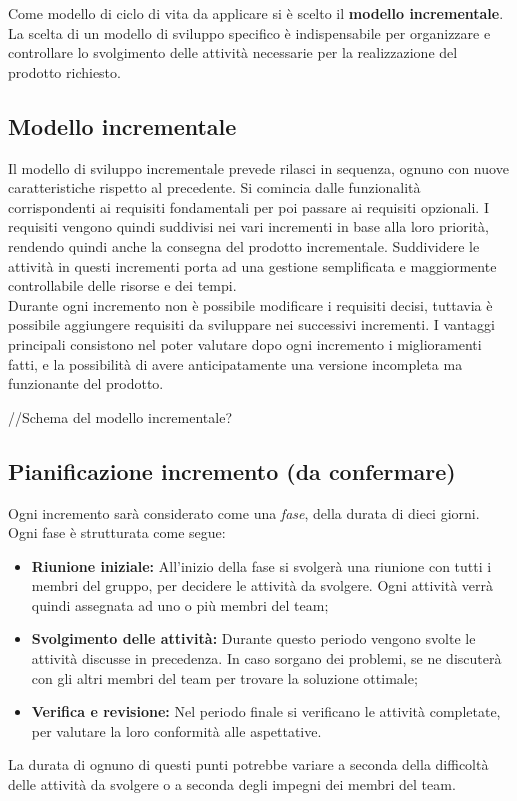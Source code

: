 Come modello di ciclo di vita da applicare si è scelto il \textbf{modello incrementale}. La scelta di un modello di sviluppo specifico è indispensabile per organizzare e controllare lo svolgimento delle attività necessarie per la realizzazione del prodotto richiesto.

\subsection{Modello incrementale}
Il modello di sviluppo incrementale prevede rilasci in sequenza, ognuno con nuove caratteristiche rispetto al precedente. Si comincia dalle funzionalità corrispondenti ai requisiti fondamentali per poi passare ai requisiti opzionali. I requisiti vengono quindi suddivisi nei vari incrementi in base alla loro priorità, rendendo quindi anche la consegna del prodotto incrementale.
Suddividere le attività in questi incrementi porta ad una gestione semplificata e maggiormente controllabile delle risorse e dei tempi.\\
Durante ogni incremento non è possibile modificare i requisiti decisi, tuttavia è possibile aggiungere requisiti da sviluppare nei successivi incrementi.
I vantaggi principali consistono nel poter valutare dopo ogni incremento i miglioramenti fatti, e la possibilità di avere anticipatamente una versione incompleta ma funzionante del prodotto. \\
\begin{center}
//Schema del modello incrementale?
\end{center}
\subsection{Pianificazione incremento (da confermare)}
Ogni incremento sarà considerato come una \textit{fase}, della durata di dieci giorni. Ogni fase è strutturata come segue:
\begin{itemize}
\item \textbf{Riunione iniziale:} All'inizio della fase si svolgerà una riunione con tutti i membri del gruppo, per decidere le attività da svolgere. Ogni attività verrà quindi assegnata ad uno o più membri del team;
\item \textbf{Svolgimento delle attività:} Durante questo periodo vengono svolte le attività discusse in precedenza. In caso sorgano dei problemi, se ne discuterà con gli altri membri del team per trovare la soluzione ottimale;
\item \textbf{Verifica e revisione:} Nel periodo finale si verificano le attività completate, per valutare la loro conformità alle aspettative.
\end{itemize}
La durata di ognuno di questi punti potrebbe variare a seconda della difficoltà delle attività da svolgere o a seconda degli impegni dei membri del team.
\pagebreak